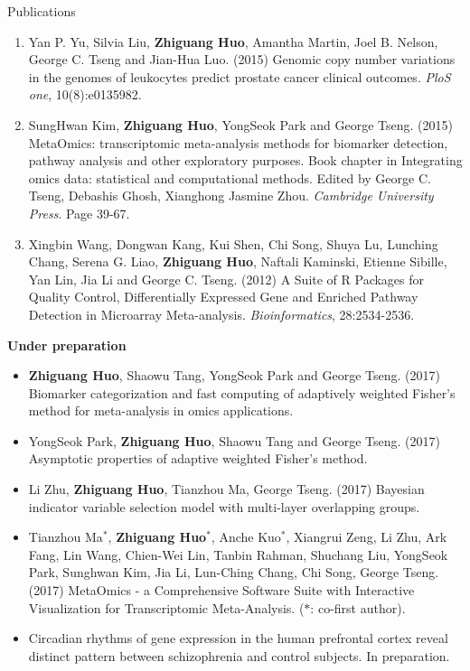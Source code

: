 \documentclass{resume} %
\begin{document}
\begin{rSection}{Publications}
\begin{enumerate}[noitemsep,topsep=0pt,resume]
    \item Yan P. Yu, Silvia Liu, {\bf Zhiguang Huo}, Amantha Martin, Joel B. Nelson, George C. Tseng and Jian-Hua Luo. (2015) Genomic copy number variations in the genomes of leukocytes predict prostate cancer clinical outcomes. \emph{PloS one}, 10(8):e0135982.

\item SungHwan Kim,  {\bf Zhiguang Huo}, YongSeok Park and George Tseng.  (2015) MetaOmics: transcriptomic meta-analysis methods for biomarker detection, pathway analysis and other exploratory purposes. Book chapter in Integrating omics data: statistical and computational methods. Edited by George C. Tseng, Debashis Ghosh, Xianghong Jasmine Zhou. \emph{Cambridge University Press}. Page 39-67.

    \item Xingbin Wang, Dongwan Kang, Kui Shen, Chi Song, Shuya Lu, Lunching Chang, Serena G. Liao, {\bf Zhiguang Huo}, Naftali Kaminski, Etienne Sibille, Yan Lin, Jia Li and George C. Tseng. (2012) A Suite of R Packages for Quality Control, Differentially Expressed Gene and Enriched Pathway Detection in Microarray Meta-analysis. \emph{Bioinformatics}, 28:2534-2536.

\end{enumerate}

\textbf{Under preparation}
\begin{itemize}
\item  {\bf Zhiguang Huo}, Shaowu Tang, YongSeok Park and George Tseng. (2017)
Biomarker categorization and fast computing of adaptively weighted Fisher's method for meta-analysis in omics applications.
\item  YongSeok Park, {\bf Zhiguang Huo}, Shaowu Tang and George Tseng. (2017)
Asymptotic properties of adaptive weighted Fisher's method.
\item Li Zhu, {\bf Zhiguang Huo}, Tianzhou Ma, George Tseng. (2017)
Bayesian indicator variable selection model with multi-layer overlapping groups.
\item Tianzhou Ma$^*$, {\bf Zhiguang Huo}$^*$, Anche Kuo$^*$, Xiangrui Zeng, Li Zhu, Ark Fang, Lin Wang, Chien-Wei Lin, Tanbin Rahman, Shuchang Liu, YongSeok Park, Sunghwan Kim, Jia Li, Lun-Ching Chang, Chi Song, George Tseng.  (2017)
MetaOmics - a Comprehensive Software Suite with Interactive Visualization for Transcriptomic Meta-Analysis.
($*$: co-first author).
\item Circadian rhythms of gene expression in the human prefrontal cortex reveal distinct pattern between schizophrenia and control subjects. In preparation.


\end{itemize}
\end{rSection}
\end{document}
